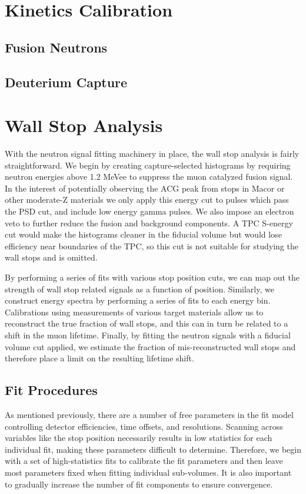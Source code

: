 \section{Kinetics Calibration}

\subsection{Fusion Neutrons}

\subsection{Deuterium Capture}

\section{Wall Stop Analysis}

With the neutron signal fitting machinery in place, the wall stop analysis is fairly straightforward.
We begin by creating capture-selected histograms by requiring neutron energies above 1.2 MeVee to suppress the muon catalyzed fusion signal.
In the interest of potentially observing the ACG peak from stops in Macor or other moderate-Z materials we only apply this energy cut to pulses which pass the PSD cut, and include low energy gamma pulses.
We also impose an electron veto to further reduce the fusion and background components.
A TPC S-energy cut would make the histograms cleaner in the fiducial volume but would lose efficiency near boundaries of the TPC, so this cut is not suitable for studying the wall stops and is omitted.

By performing a series of fits with various stop position cuts, we can map out the strength of wall stop related signals as a function of position.  
Similarly, we construct energy spectra by performing a series of fits to each energy bin.
Calibrations using measurements of various target materials allow us to reconstruct the true fraction of wall stops, and this can in turn be related to a shift in the muon lifetime.
Finally, by fitting the neutron signals with a fiducial volume cut applied, we estimate the fraction of mis-reconstructed wall stops and therefore place a limit on the resulting lifetime shift.

\subsection{Fit Procedures}

As mentioned previously, there are a number of free parameters in the fit model controlling detector efficiencies, time offsets, and resolutions.
Scanning across variables like the stop position necessarily results in low statistics for each individual fit, making these parameters difficult to determine.
Therefore, we begin with a set of high-statistics fits to calibrate the fit parameters and then leave most parameters fixed when fitting individual sub-volumes.
It is also important to gradually increase the number of fit components to ensure convergence.

